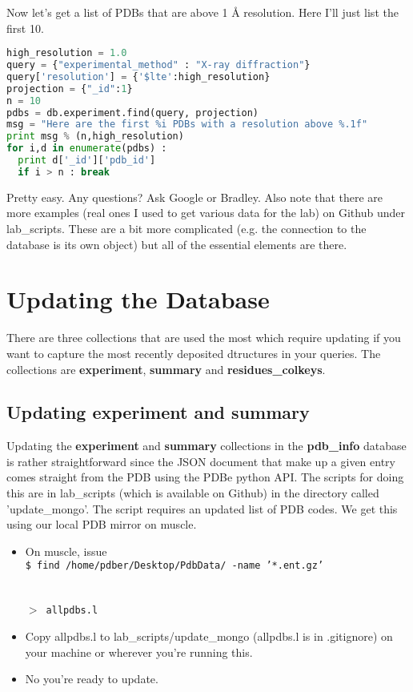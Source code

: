\documentclass[12pt]{article}
\newcommand{\cmdline}[1]{\vspace{5mm} \noindent
\texttt{\$ #1}
\vspace{5mm}

}
\newcommand{\mdbdb}[1]{{\color{BlueViolet}\textbf{#1}}}
\newcommand{\mdbcol}[1]{{\color{Bittersweet}\textbf{#1}}}
\begin{document}
\noindent
Now let's get a list of PDBs that are above 1 \AA{} resolution.
Here I'll just list the first 10.

\begin{lstlisting}[language=python]
high_resolution = 1.0
query = {"experimental_method" : "X-ray diffraction"}
query['resolution'] = {'$lte':high_resolution}
projection = {"_id":1}
n = 10
pdbs = db.experiment.find(query, projection)
msg = "Here are the first %i PDBs with a resolution above %.1f"
print msg % (n,high_resolution)
for i,d in enumerate(pdbs) :
  print d['_id']['pdb_id']
  if i > n : break
\end{lstlisting}

\noindent
Pretty easy.
Any questions?
Ask Google or Bradley.
Also note that there are more examples (real ones I used to get various data for the lab) on Github under lab\_scripts.
These are a bit more complicated (e.g. the connection to the database is its own object) but all of the essential elements are there.

\section{Updating the Database}

There are three collections that are used the most which require updating if you want to capture the most recently deposited dtructures in your queries. The collections are \mdbcol{experiment}, \mdbcol{summary} and \mdbcol{residues\_colkeys}.

\subsection{Updating \mdbcol{experiment} and \mdbcol{summary}}

Updating the \mdbcol{experiment} and \mdbcol{summary} collections in the \mdbdb{pdb\_info} database is rather straightforward since the JSON document that make up a given entry comes straight from the PDB using the PDBe python API. The scripts for doing this are in lab\_scripts (which is available on Github) in the directory called 'update\_mongo'. The script requires an updated list of PDB codes. We get this using our local PDB mirror on muscle.

\begin{itemize}
\item On muscle, issue \\
\cmdline{find /home/pdber/Desktop/PdbData/ -name '*.ent.gz' \\\\ \\ $>$ allpdbs.l}
\item Copy allpdbs.l to lab\_scripts/update\_mongo (allpdbs.l is in .gitignore) on your machine or wherever you're running this.
\item No you're ready to update.
\end{itemize}
\end{document}
